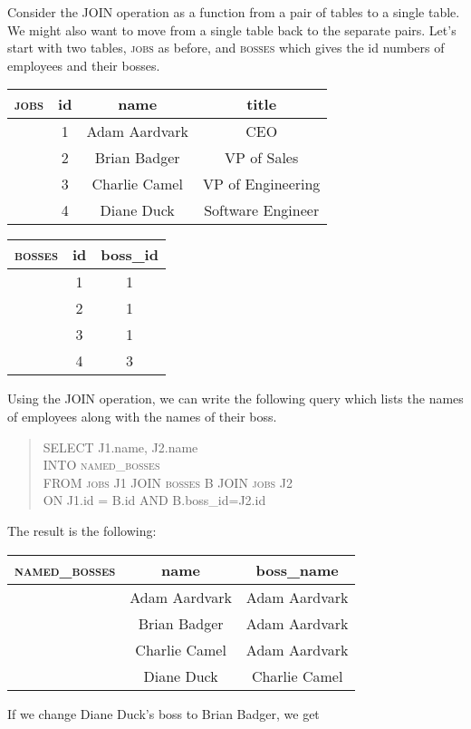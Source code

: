 \documentclass{article}
\begin{document}
Consider the JOIN operation as a function from a pair of tables to a single
table. We might also want to move from a single table back to the 
separate pairs. Let's start with two tables, \textsc{jobs} as before,
and \textsc{bosses} which gives the id numbers of employees and their bosses.
\begin{center} \begin{tabular} {c | c c c}
    \textsc{jobs} & id & name & title \\
    \hline
    & 1 & Adam Aardvark & CEO \\
    & 2 & Brian Badger & VP of Sales \\
    & 3 & Charlie Camel & VP of Engineering \\
    & 4 & Diane Duck & Software Engineer
\end{tabular} \end{center}
\begin{center} \begin{tabular} {c | c c }
    \textsc{bosses} & id & boss\_id \\
    \hline
    & 1 & 1 \\
    & 2 & 1 \\
    & 3 & 1 \\
    & 4 & 3 
\end{tabular} \end{center}
Using the JOIN operation, we can write the following query which lists 
the names of employees along with the names of their boss.
\begin{quote}
    SELECT J1.name, J2.name \\
    INTO \textsc{named\_bosses} \\
    FROM \textsc{jobs} J1 JOIN \textsc{bosses} B JOIN \textsc{jobs} J2 \\
    ON J1.id = B.id AND B.boss\_id=J2.id
\end{quote}
The result is the following:
\begin{center} \begin{tabular} {c | c c }
    \textsc{named\_bosses} & name & boss\_name \\
    \hline
    & Adam Aardvark & Adam Aardvark \\
    & Brian Badger & Adam Aardvark \\
    & Charlie Camel & Adam Aardvark \\
    & Diane Duck & Charlie Camel
\end{tabular} \end{center}
If we change Diane Duck's boss to Brian Badger, we get
\end{document}
